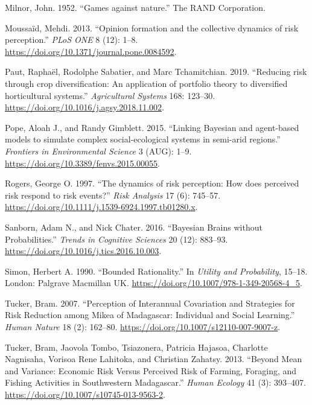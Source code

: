 \documentclass[smallextended]{svjour3}       %
\begin{document}
\leavevmode\hypertarget{ref-Milnor1952}{}%
Milnor, John. 1952. ``Games against nature.'' The RAND Corporation.

\leavevmode\hypertarget{ref-Moussaid2013}{}%
Moussaïd, Mehdi. 2013. ``Opinion formation and the collective dynamics of risk perception.'' \emph{PLoS ONE} 8 (12): 1--8. \url{https://doi.org/10.1371/journal.pone.0084592}.

\leavevmode\hypertarget{ref-Paut2019}{}%
Paut, Raphaël, Rodolphe Sabatier, and Marc Tchamitchian. 2019. ``Reducing risk through crop diversification: An application of portfolio theory to diversified horticultural systems.'' \emph{Agricultural Systems} 168: 123--30. \url{https://doi.org/10.1016/j.agsy.2018.11.002}.

\leavevmode\hypertarget{ref-Pope2015}{}%
Pope, Aloah J., and Randy Gimblett. 2015. ``Linking Bayesian and agent-based models to simulate complex social-ecological systems in semi-arid regions.'' \emph{Frontiers in Environmental Science} 3 (AUG): 1--9. \url{https://doi.org/10.3389/fenvs.2015.00055}.

\leavevmode\hypertarget{ref-Rogers1997}{}%
Rogers, George O. 1997. ``The dynamics of risk perception: How does perceived risk respond to risk events?'' \emph{Risk Analysis} 17 (6): 745--57. \url{https://doi.org/10.1111/j.1539-6924.1997.tb01280.x}.

\leavevmode\hypertarget{ref-Sanborn2016}{}%
Sanborn, Adam N., and Nick Chater. 2016. ``Bayesian Brains without Probabilities.'' \emph{Trends in Cognitive Sciences} 20 (12): 883--93. \url{https://doi.org/10.1016/j.tics.2016.10.003}.

\leavevmode\hypertarget{ref-Simon1990}{}%
Simon, Herbert A. 1990. ``Bounded Rationality.'' In \emph{Utility and Probability}, 15--18. London: Palgrave Macmillan UK. \url{https://doi.org/10.1007/978-1-349-20568-4_5}.

\leavevmode\hypertarget{ref-Tucker2007}{}%
Tucker, Bram. 2007. ``Perception of Interannual Covariation and Strategies for Risk Reduction among Mikea of Madagascar: Individual and Social Learning.'' \emph{Human Nature} 18 (2): 162--80. \url{https://doi.org/10.1007/s12110-007-9007-z}.

\leavevmode\hypertarget{ref-Tucker2013}{}%
Tucker, Bram, Jaovola Tombo, Tsiazonera, Patricia Hajasoa, Charlotte Nagnisaha, Vorisoa Rene Lahitoka, and Christian Zahatsy. 2013. ``Beyond Mean and Variance: Economic Risk Versus Perceived Risk of Farming, Foraging, and Fishing Activities in Southwestern Madagascar.'' \emph{Human Ecology} 41 (3): 393--407. \url{https://doi.org/10.1007/s10745-013-9563-2}.
\end{document}
